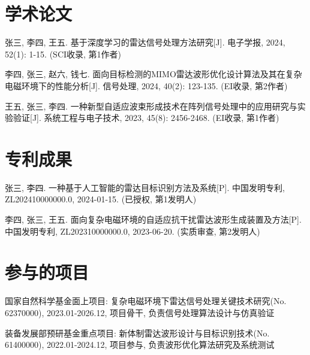 \begin{resume}
\ifreview

\section*{学术论文}

\begin{enumerate}[label={\hspace{2em}[\arabic*]},itemsep=0pt,parsep=0pt,labelwidth=0pt,labelsep=0pt,leftmargin=0pt,itemindent=0pt,align=left]
\item 张三, 李四, 王五. 基于深度学习的雷达信号处理方法研究[J]. 电子学报, 2024, 52(1): 1-15. (SCI收录, 第1作者)
\item 李四, 张三, 赵六, 钱七. 面向目标检测的MIMO雷达波形优化设计算法及其在复杂电磁环境下的性能分析[J]. 信号处理, 2024, 40(2): 123-135. (EI收录, 第2作者)
\item 王五, 张三, 李四. 一种新型自适应波束形成技术在阵列信号处理中的应用研究与实验验证[J]. 系统工程与电子技术, 2023, 45(8): 2456-2468. (EI收录, 第1作者)
\end{enumerate}

\section*{专利成果}

\begin{enumerate}[label={\hspace{2em}[\arabic*]},itemsep=0pt,parsep=0pt,labelwidth=0pt,labelsep=0pt,leftmargin=0pt,itemindent=0pt,align=left]
\item 张三, 李四. 一种基于人工智能的雷达目标识别方法及系统[P]. 中国发明专利, ZL202410000000.0, 2024-01-15. (已授权, 第1发明人)
\item 李四, 张三, 王五. 面向复杂电磁环境的自适应抗干扰雷达波形生成装置及方法[P]. 中国发明专利, ZL202310000000.0, 2023-06-20. (实质审查, 第2发明人)
\end{enumerate}

\section*{参与的项目}

\begin{enumerate}[label={\hspace{2em}[\arabic*]},itemsep=0pt,parsep=0pt,labelwidth=0pt,labelsep=0pt,leftmargin=0pt,itemindent=0pt,align=left]
\item 国家自然科学基金面上项目: 复杂电磁环境下雷达信号处理关键技术研究(No. 62370000), 2023.01-2026.12, 项目骨干, 负责信号处理算法设计与仿真验证
\item 装备发展部预研基金重点项目: 新体制雷达波形设计与目标识别技术(No. 61400000), 2022.01-2024.12, 项目参与, 负责波形优化算法研究及系统测试
\end{enumerate}


\end{resume}
